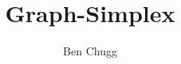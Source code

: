 \documentclass[11pt, oneside]{book}
\title{Graph-Simplex}
\author{Ben Chugg}
\date{}
\begin{document}
%

\midmatterstyling






\backmatterstyling


\end{document}
